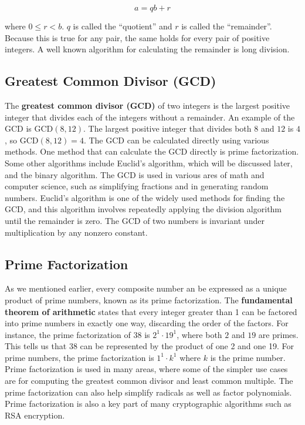 \documentclass{article}
\renewcommand{\_}{\ifincsname_\else\legacyunderscore\fi}
\begin{document}
        \begin{equation}
            a = q b + r
        \end{equation}

        where $0 \leq r < b$.  $q$ is called the ``quotient'' and $r$ is called the ``remainder''.  Because this is true for any pair, the same holds for every pair of positive integers.  A well known algorithm for calculating the remainder is long division.

    \subsection{Greatest Common Divisor (GCD)}
    The \textbf{greatest common divisor (GCD)} of two integers is the largest positive integer that divides each of the integers without a remainder. An example of the GCD is GCD$(8, 12)$. The largest positive integer that divides both $8$ and $12$ is $4$, so GCD$(8, 12)=4$. The GCD can be calculated directly using various methods. One method that can calculate the GCD directly is prime factorization. Some other algorithms include Euclid's algorithm, which will be discussed later, and the binary algorithm. The GCD is used in various ares of math and computer science, such as simplifying fractions and in generating random numbers. Euclid's algorithm is one of the widely used methods for finding the GCD, and this algorithm involves repeatedly applying the division algorithm until the remainder is zero. The GCD of two numbers is invariant under multiplication by any nonzero constant.  
    
    

    

    \subsection{Prime Factorization}
    As we mentioned earlier, every composite number an be expressed as a unique product of prime numbers, known as its prime factorization. The \textbf{fundamental theorem of arithmetic} states that every integer greater than 1 can be factored into prime numbers in exactly one way, discarding the order of the factors. For instance, the prime factorization of $38$ is $2^1\cdot 19^1$, where both $2$ and $19$ are primes. This tells us that $38$ can be represented by the product of one 2 and one 19. For prime numbers, the prime factorization is $1^1\cdot k^1$ where $k$ is the prime number. Prime factorization is used in many areas, where some of the simpler use cases are for computing the greatest common divisor and least common multiple. The prime factorization can also help simplify radicals as well as factor polynomials. Prime factorization is also a key part of many cryptographic algorithms such as RSA encryption. 
\end{document}
